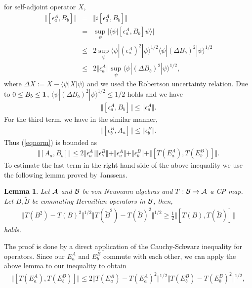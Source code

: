 \documentclass[showpacs,preprintnumbers,amsmath,amssymb]{revtex4}
\newtheorem{lemma}{Lemma}
\begin{document}
for self-adjoint operator $X$, 
\begin{eqnarray*}
\Vert [\epsilon^A_a, B_b]\Vert &=&
\Vert i[\epsilon^A_a, B_b]\Vert \\
&=&\sup_{\psi}|\langle \psi|
[\epsilon^A_a, B_b]\psi\rangle|
\\
&\leq& 
2 \sup_{\psi} \langle \psi|(\epsilon^A_a)^2 |\psi \rangle^{1/2}
\langle \psi|(\Delta B_b)^2 |\psi\rangle^{1/2}
\\
&\leq&
 2 \Vert \epsilon^A_a\Vert \sup_{\psi}\langle 
\psi|(\Delta B_b)^2|\psi\rangle^{1/2},
\end{eqnarray*}
where $\Delta X:=X-\langle \psi|X|\psi \rangle$ and we used the 
Robertson uncertainty relation. 
Due to $0\leq B_b \leq {\bf 1}$, 
$\langle \psi|(\Delta B_b)^2 |\psi\rangle^{1/2}\leq 1/2$ holds and
we have
\begin{eqnarray*}
\Vert [\epsilon^A_a, B_b]\Vert\leq \Vert \epsilon^A_a\Vert. 
\end{eqnarray*} 
For the third term, we have in the similar manner, 
\begin{eqnarray*}
\Vert [\epsilon^B_b, A_a]\Vert \leq \Vert \epsilon^B_b\Vert.
\end{eqnarray*}
Thus (\ref{eqnorm}) is bounded as
\begin{eqnarray}
\Vert [A_a,B_b]\Vert
\leq 2\Vert \epsilon^A_a \Vert \Vert \epsilon^B_b \Vert 
+\Vert \epsilon^A_a \Vert +\Vert \epsilon^B_b \Vert 
+\Vert [T(E^A_a), T(E^B_b)]\Vert. 
\label{mouchoi}
\end{eqnarray}
To estimate the last term in the right hand side of the above 
inequality we use the following lemma proved by Janssens\cite{Janssens}.
\begin{lemma}
Let ${\cal A}$ and ${\cal B}$ be von Neumann algebras and 
$T: {\cal B} \to {\cal A}$ a CP map. 
Let $B, \tilde{B}$ be commuting Hermitian operators in ${\cal B}$, 
then, 
\begin{eqnarray*}
\Vert T(B^2)-T(B)^2\Vert^{1/2}
\Vert T(\tilde{B}^2)-T(\tilde{B})^2\Vert^{1/2}
\geq \frac{1}{2}\Vert [T(B),T(\tilde{B})]\Vert
\end{eqnarray*}
holds. 
\end{lemma}
The proof is done by a direct application of the 
Cauchy-Schwarz inequality for operators. 
Since our $E^A_a$ and $E^B_b$ commute with each other, 
we can apply the above lemma to our inequality to obtain
\begin{eqnarray}
\Vert [T(E^A_a),T(E^B_b)]\Vert 
\leq 2 \Vert T(E^A_a)-T(E^A_a)^2\Vert^{1/2} 
\Vert T(E^B_b)-T(E^B_b)^2\Vert^{1/2},
\label{Tcommutator}
\end{eqnarray}
\end{document}
